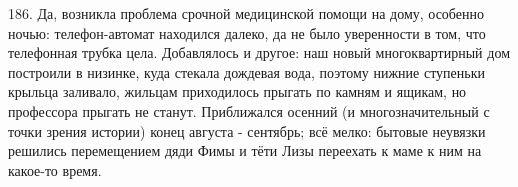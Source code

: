 186. Да, возникла проблема срочной медицинской помощи на дому, особенно ночью: телефон-автомат находился далеко, да не было уверенности в том, что телефонная трубка цела. Добавлялось и другое: наш новый многоквартирный дом построили в низинке, куда стекала дождевая вода, поэтому нижние ступеньки крыльца заливало, жильцам приходилось прыгать по камням и ящикам, но профессора прыгать не станут. Приближался осенний (и многозначительный с точки зрения истории) конец августа - сентябрь; всё мелко: бытовые неувязки решились перемещением дяди Фимы и тёти Лизы переехать к маме к ним на какое-то время.